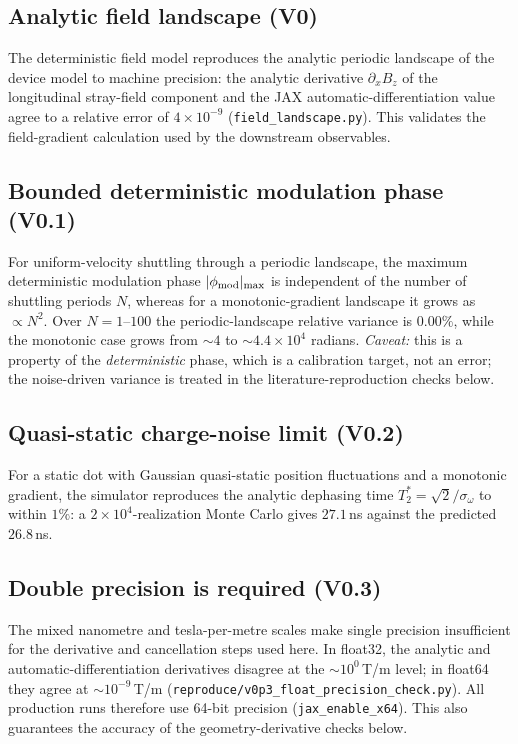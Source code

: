 \documentclass[aip,jap,reprint,onecolumn,superscriptaddress,longbibliography]{revtex4-2}
\begin{document}
\subsection{Analytic field landscape (V0)}
The deterministic field model reproduces the analytic periodic
landscape of the device model to machine precision: the analytic
derivative $\partial_x B_z$ of the longitudinal stray-field component and the
JAX automatic-differentiation value agree to a relative error of $4\times10^{-9}$
(\texttt{field\_landscape.py}). This validates the field-gradient
calculation used by the downstream observables.

\subsection{Bounded deterministic modulation phase (V0.1)}
For uniform-velocity shuttling through a periodic landscape, the
maximum deterministic modulation phase $|\phi_{\rm mod}|_{\rm max}$ is
independent of the number of shuttling periods $N$, whereas for a
monotonic-gradient landscape it grows as $\propto N^2$. Over
$N=1$--$100$ the periodic-landscape relative variance is $0.00\%$,
while the monotonic case grows from $\sim\!4$ to $\sim\!4.4\times10^4$
radians. \emph{Caveat:} this is a property of the \emph{deterministic}
phase, which is a calibration target, not an error; the
noise-driven variance is treated in the literature-reproduction
checks below.

\subsection{Quasi-static charge-noise limit (V0.2)}
For a static dot with Gaussian quasi-static position fluctuations and a
monotonic gradient, the simulator reproduces the analytic dephasing
time $T_2^\ast=\sqrt{2}/\sigma_\omega$ to within $1\%$: a
$2\times10^4$-realization Monte Carlo gives $27.1$\,ns against the
predicted $26.8$\,ns.

\subsection{Double precision is required (V0.3)}
The mixed nanometre and tesla-per-metre scales make single precision
insufficient for the derivative and cancellation steps used here. In float32,
the analytic and automatic-differentiation derivatives disagree at the
$\sim\!10^{0}$\,T/m level; in float64 they agree at
$\sim\!10^{-9}$\,T/m
(\texttt{reproduce/v0p3\_float\_precision\_check.py}). All production runs
therefore use 64-bit precision (\texttt{jax\_enable\_x64}). This also
guarantees the accuracy of the geometry-derivative checks below.
\end{document}
